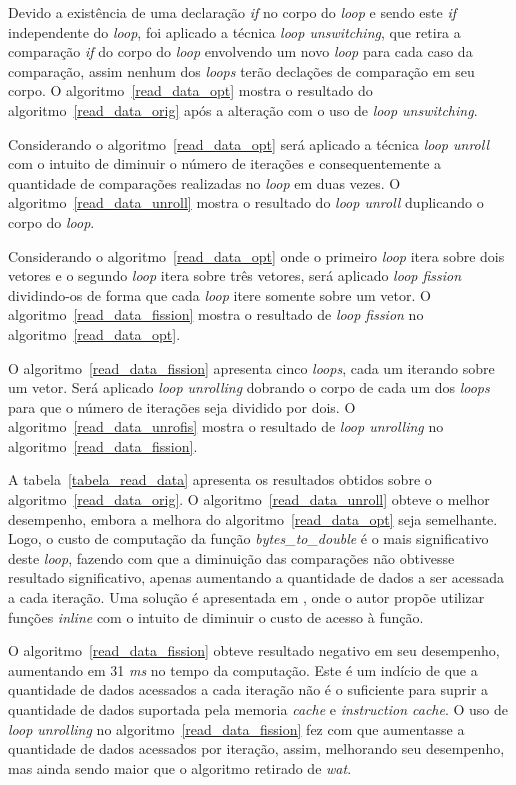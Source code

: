 Devido a existência de uma declaração \textit{if} no corpo do \textit{loop} e
sendo este \textit{if} independente do \textit{loop}, foi aplicado a técnica 
\textit{loop unswitching}, que retira a comparação
\textit{if} do corpo do \textit{loop} envolvendo um novo \textit{loop} para cada caso
da comparação, assim nenhum dos \textit{loops} terão declações de comparação em seu
corpo.
O algoritmo~\ref{read_data_opt} mostra o resultado do
algoritmo~\ref{read_data_orig} após a alteração com o uso de \textit{loop unswitching}.

Considerando o algoritmo~\ref{read_data_opt} será aplicado a técnica 
\textit{loop unroll} com o intuito de diminuir o número de iterações e 
consequentemente a
quantidade de comparações realizadas no \textit{loop} em duas vezes. 
O algoritmo~\ref{read_data_unroll} mostra o resultado do \textit{loop
unroll} duplicando o corpo do \textit{loop}.

Considerando o algoritmo~\ref{read_data_opt} onde o primeiro \textit{loop} itera
sobre dois vetores e o segundo \textit{loop} itera
sobre três vetores, será aplicado \textit{loop fission} dividindo-os de forma
que cada \textit{loop} itere somente sobre um vetor.
O algoritmo~\ref{read_data_fission} mostra o resultado de \textit{loop fission}
no algoritmo~\ref{read_data_opt}.

O algoritmo~\ref{read_data_fission} apresenta cinco \textit{loops}, cada um
iterando sobre um vetor. Será aplicado \textit{loop unrolling} dobrando o corpo
de cada um dos \textit{loops} para que o número de iterações seja dividido por
dois.
O algoritmo~\ref{read_data_unrofis} mostra o resultado de \textit{loop
unrolling} no algoritmo~\ref{read_data_fission}.

A tabela~\ref{tabela_read_data} apresenta os resultados obtidos sobre o
algoritmo~\ref{read_data_orig}. 
O algoritmo~\ref{read_data_unroll} obteve o melhor desempenho, embora a melhora
do algoritmo~\ref{read_data_opt} seja semelhante. 
Logo, o custo de computação da função \textit{bytes\_to\_double} é o mais
significativo deste \textit{loop}, fazendo com que a diminuição das comparações
não obtivesse resultado significativo, apenas aumentando a quantidade de dados a
ser acessada a cada iteração. 
Uma solução é apresentada em \cite{Miniskar:2012}, 
onde o autor propõe utilizar funções \textit{inline} com o intuito de diminuir o custo
de acesso à função.

O algoritmo~\ref{read_data_fission} obteve resultado negativo em seu desempenho,
aumentando em 31 \textit{ms} no tempo da computação. Este é um indício de que a
quantidade de dados acessados a cada iteração não é o suficiente para suprir a
quantidade de dados suportada pela memoria \textit{cache} e \textit{instruction
cache}. 
O uso de \textit{loop unrolling} no algoritmo~\ref{read_data_fission} fez com
que aumentasse a quantidade de dados acessados por iteração, assim, melhorando seu
desempenho, mas ainda sendo maior que o algoritmo retirado de \textit{wat}.

